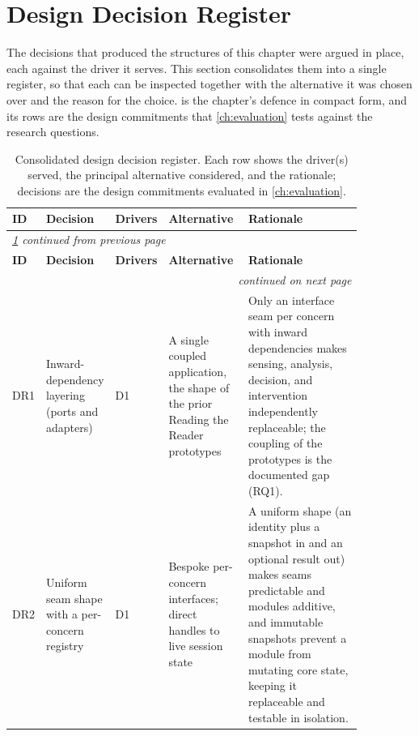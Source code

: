 \section{Design Decision Register}
\label{sec:design-decisions}
The decisions that produced the structures of this chapter were argued in place, each against the driver it serves.
This section consolidates them into a single register, so that each can be inspected together with the alternative it was chosen over and the reason for the choice.
 is the chapter's defence in compact form, and its rows are the design commitments that \cref{ch:evaluation} tests against the research questions.

\begingroup
\small
\setlength{\tabcolsep}{4pt}
\renewcommand{\arraystretch}{1.15}
\begin{longtable}{p{0.035\linewidth} p{0.165\linewidth} p{0.07\linewidth} p{0.235\linewidth} p{0.35\linewidth}}
\caption[Consolidated design decision register.]{Consolidated design decision register. Each row shows the driver(s) served, the principal alternative considered, and the rationale; decisions are the design commitments evaluated in \cref{ch:evaluation}.}
\label{tab:design-decisions}\\
\toprule
\textbf{ID} & \textbf{Decision} & \textbf{Drivers} & \textbf{Alternative} & \textbf{Rationale} \\
\midrule
\endfirsthead
\multicolumn{5}{l}{\itshape \cref{tab:design-decisions} continued from previous page}\\
\toprule
\textbf{ID} & \textbf{Decision} & \textbf{Drivers} & \textbf{Alternative} & \textbf{Rationale} \\
\midrule
\endhead
\midrule
\multicolumn{5}{r}{\itshape continued on next page}\\
\endfoot
\bottomrule
\endlastfoot
DR1 & Inward-dependency layering (ports and adapters) & D1 & A single coupled application, the shape of the prior Reading the Reader prototypes & Only an interface seam per concern with inward dependencies makes sensing, analysis, decision, and intervention independently replaceable; the coupling of the prototypes is the documented gap (RQ1). \\
\addlinespace
DR2 & Uniform seam shape with a per-concern registry & D1 & Bespoke per-concern interfaces; direct handles to live session state & A uniform shape (an identity plus a snapshot in and an optional result out) makes seams predictable and modules additive, and immutable snapshots prevent a module from mutating core state, keeping it replaceable and testable in isolation. \\

\end{longtable}
